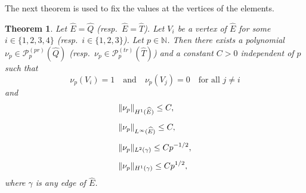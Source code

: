 \documentclass[english, 12pt, a4paper, sci, utf8, a-2b, online]{aaltothesis}
\theoremstyle{definition}
\theoremstyle{plain}
\newtheorem{theorem}{Theorem}[section]
\DeclarePairedDelimiter\norm{\lVert}{\rVert}
\numberwithin{equation}{section}
\begin{document}
The next theorem is used to fix the values at the vertices of the elements.
\begin{theorem}
    \label{thm:auxiliary_vertex}
    Let $\widehat{E} = \widehat{Q}$ (resp.\ $\widehat{E} = \widehat{T}$).
    Let $V_i$ be a vertex of $\widehat{E}$ for some $i \in \{1,2,3,4\}$
    (resp.\ $i \in \{1,2,3\}$). Let $p \in \mathbb{N}$.
    Then there exists a polynomial $\nu_p \in \mathcal{P}_p^{(pr)}(\widehat{Q})$
    (resp.\ $\nu_p \in \mathcal{P}_p^{(tr)}(\widehat{T})$) and
    a constant $C > 0$ independent of $p$ such that
    \begin{equation}
        \label{eq:auxiliary_vertex_vertices}
        \nu_p(V_i) = 1
        \quad \text{and} \quad
        \nu_p(V_j) = 0 \text{ } \text{ for all } j \neq i
    \end{equation}
    and
    \begin{align}
        \label{eq:auxiliary_vertex_res1}
        &\norm{\nu_p}_{H^1(\widehat{E})} \leq C, \\[0.5em]
        \label{eq:auxiliary_vertex_res2}
        &\norm{\nu_p}_{L^{\infty}(\widehat{E})} \leq C, \\[0.5em]
        \label{eq:auxiliary_vertex_res3}
        &\norm{\nu_p}_{L^2(\gamma)} \leq C p^{-1/2}, \\[0.5em]
        \label{eq:auxiliary_vertex_res4}
        &\norm{\nu_p}_{H^1(\gamma)} \leq C p^{1/2},
    \end{align}
    where $\gamma$ is any edge of $\widehat{E}$.
\end{theorem}
\end{document}
